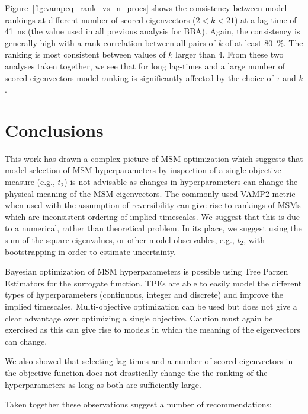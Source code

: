 \documentclass[journal=jacsat,manuscript=article]{achemso}
\begin{document}
Figure~\ref{fig:vampeq_rank_vs_n_procs} shows the consistency between model rankings at different number of scored eigenvectors ($2 < k < 21$) at a lag time of \SI{41}{\nano\second} (the value used in all previous analysis for BBA). Again, the consistency is generally high with a rank correlation between all pairs of $k$ of at least \SI{80}{\percent}. The ranking is most consistent between values of $k$ larger than \num{4}.  From these two analyses taken together, we see that for long lag-times and a large number of scored eigenvectors model ranking is significantly affected by the choice of $\tau$ and $k$.

\section{Conclusions}

This work has drawn a complex picture of MSM optimization which suggests that model selection of MSM hyperparameters by inspection of a single objective measure (e.g., $t_2$) is not advisable as changes in hyperparameters can change the physical meaning of the MSM eigenvectors.  The commonly used VAMP2 metric when used with the assumption of reversibility can give rise to rankings of MSMs which are inconsistent ordering of implied timescales. We suggest that this is due to a numerical, rather than theoretical problem. In its place, we suggest using the sum of the square eigenvalues, or other model observables, e.g., $t_2$, with bootstrapping in order to estimate uncertainty.  

Bayesian optimization of MSM hyperparameters is possible using Tree Parzen Estimators for the surrogate function.  TPEs are able to easily model the different types of hyperparameters (continuous, integer and discrete) and improve the implied timescales. Multi-objective optimization can be used but does not give a clear advantage over optimizing a single objective.  Caution must again be exercised as this can give rise to models in which the meaning of the eigenvectors can change. 

We also showed that selecting lag-times and a number of scored eigenvectors in the objective function does not drastically change the the ranking of the hyperparameters as long as both are sufficiently large.  

Taken together these observations suggest a number of recommendations: 
\end{document}
